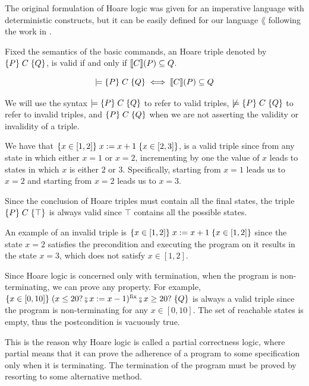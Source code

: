 \documentclass[
  10pt,       %
  twoside,    %
  a4paper,    %
  english,    %
  tikz,       %
  openright,  %
]{book}
\begin{document}
The original formulation of Hoare logic was given for an imperative language 
with deterministic constructs, but it can be easily defined for our language 
$\lang$ following the work in \cite{Moller21}.

\begin{definition}
  \label{def:hoare}
  Fixed the semantics of the basic commands, an Hoare triple denoted by 
  $\{ P \} \; C \; \{ Q \}$, is valid if and only if $\llbracket C \rrbracket(P) \subseteq Q$.

  $$\models \{ P \} \; C \; \{ Q \} \iff \llbracket C \rrbracket(P) \subseteq Q$$
\end{definition}

We will use the syntax $\models \{ P \} \; C \; \{ Q \}$ to refer to valid triples,
$\not \models \{ P \} \; C \; \{ Q \}$ to refer to invalid triples, and
$\{ P \} \; C \; \{ Q \}$ when we are not asserting the validity or invalidity of a
triple.

\begin{example}
  \label{exmp:hlogic}
We have that $\{ x \in [1, 2] \} \; x := x + 1 \; \{ x \in [2, 3] \}$, is a
valid triple since from any state in which either $x = 1$ or $x = 2$,
incrementing by one the value of $x$ leads to states in which $x$ is either $2$
or $3$. Specifically, starting from $x = 1$ leads us to $x = 2$ and starting
from $x = 2$ leads us to $x = 3$.

Since the conclusion of Hoare triples must contain all the final states, the
triple $\{ P \} \; C \; \{ \top \}$ is always valid since $\top$ contains all the
possible states.

An example of an invalid triple is $\{ x \in [1, 2] \} \; x := x
+ 1 \; \{ x \in [1, 2] \}$ since the state $x = 2$ satisfies the precondition and
executing the program on it results in the state $x = 3$, which does not satisfy
$x \in [1, 2]$.

Since Hoare logic is concerned only with termination, when the program is
non-terminating, we can prove any property. For example, $\htriple{x
\in [0, 10]}{(x \leq 20? \fcmp x := x - 1)^\fix \fcmp x \geq 20?}{Q}$ is always
a valid triple since the program is non-terminating for any $x \in [0, 10]$. 
The set of reachable states is empty, thus the postcondition is vacuously true.

This is the reason why Hoare logic is called a partial correctness logic,
where partial means that it can prove the adherence of a program to
some specification only when it is terminating. The termination of the program
must be proved by resorting to some alternative method.
\end{example}
\end{document}
